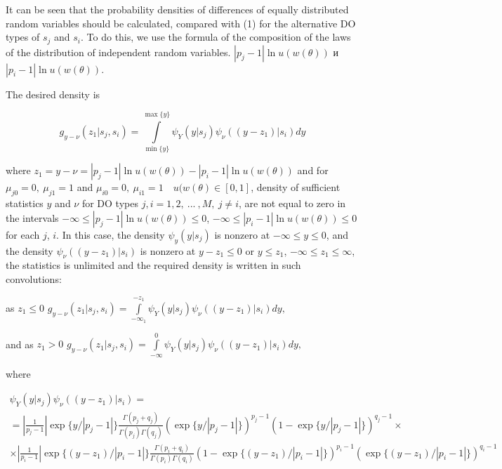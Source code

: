 It can be seen that the probability densities of differences of equally distributed random variables should be calculated, compared with (1) for the alternative DO types of  ${{s}_{j}}$ and ${{s}_{i}}$. To do this, we use the formula of the composition of the laws of the distribution of independent random variables. $\left| {{p}_{j}}-1 \right|\ln u(w(\theta ))$ и $\left| {{p}_{i}}-1 \right|\ln u(w(\theta ))$.

The desired density is

\begin{equation*}
{{g}_{y-\nu }}({{z}_{1}}|{{s}_{j}},{{s}_{i}})=\int\limits_{\min \{y\}}^{\max \{y\}}{{{\psi }_{Y}}(y|{{s}_{j}}){{\psi }_{\nu }}((y-{{z}_{1}})|{{s}_{i}})dy}
\end{equation*}

where ${{z}_{1}}=y-\nu =\left| {{p}_{j}}-1 \right|\ln u(w(\theta ))-\left| {{p}_{i}}-1 \right|\ln u(w(\theta ))$ and for ${{\mu }_{j0}}=0,\ {{\mu }_{j1}}=1$ and ${{\mu }_{i0}}=0,\ {{\mu }_{i1}}=1\quad u(w(\theta )\in \left[ 0,1 \right]$, density of sufficient statistics $y$ and $\nu $ for DO types $j,i=1,2,\ ...\ ,M,\ j\ne i$, are not equal to zero in the intervals $-\infty \le \left| {{p}_{j}}-1 \right|\ln u(w(\theta ))\le 0$, $-\infty \le \left| {{p}_{i}}-1 \right|\ln u(w(\theta ))\le 0$ for each $j$, $i$. In this case, the density ${{\psi }_{y}}(y|{{s}_{j}})$ is nonzero at $-\infty \le y\le 0$, and the density ${{\psi }_{\nu }}((y-{{z}_{1}})|{{s}_{i}})$ is nonzero at $y-{{z}_{1}}\le 0$ or $y\le {{z}_{1}}$, $-\infty \le {{z}_{1}}\le \infty $, the statistics is unlimited and the required density is written in such convolutions:

as ${{z}_{1}}\le 0$ ${{g}_{y-\nu }}({{z}_{1}}|{{s}_{j}},{{s}_{i}})=\int\limits_{-{{\infty }_{1}}}^{-{{z}_{1}}}{{{\psi }_{Y}}(y|{{s}_{j}}){{\psi }_{\nu }}((y-{{z}_{1}})|{{s}_{i}})dy},$

and as ${{z}_{1}}>0$ ${{g}_{y-\nu }}({{z}_{1}}|{{s}_{j}},{{s}_{i}})=\int\limits_{-\infty }^{0}{{{\psi }_{Y}}(y|{{s}_{j}}){{\psi }_{\nu }}((y-{{z}_{1}})|{{s}_{i}})dy},$

where 

\begin{equation*}
\begin{gathered}
 {{\psi }_{Y}}(y|{{s}_{j}}){{\psi }_{\nu }}((y-{{z}_{1}})|{{s}_{i}})= \\ 
  =\left| \frac{1}{{{p}_{j}}-1} \right|\exp \{y/\left| {{p}_{j}}-1 \right|\}\frac{\Gamma ({{p}_{j}}+{{q}_{j}})}{\Gamma ({{p}_{j}})\Gamma ({{q}_{j}})}{{\left( \exp \{y/\left| {{p}_{j}}-1 \right|\} \right)}^{{{p}_{j}}-1}}{{\left( 1-\exp \{y/\left| {{p}_{j}}-1 \right|\} \right)}^{{{q}_{j}}-1}}\times  \\ 
  \times \left| \frac{1}{{{p}_{i}}-1} \right|\exp \{(y-{{z}_{1}})/\left| {{p}_{i}}-1 \right|\}\frac{\Gamma ({{p}_{i}}+{{q}_{i}})}{\Gamma ({{p}_{i}})\Gamma ({{q}_{i}})}{{\left( 1-\exp \{(y-{{z}_{1}})/\left| {{p}_{i}}-1 \right|\} \right)}^{{{p}_{i}}-1}}{{\left( \exp \{(y-{{z}_{1}})/\left| {{p}_{i}}-1 \right|\} \right)}^{{{q}_{i}}-1}}
\end{gathered}
\end{equation*}

